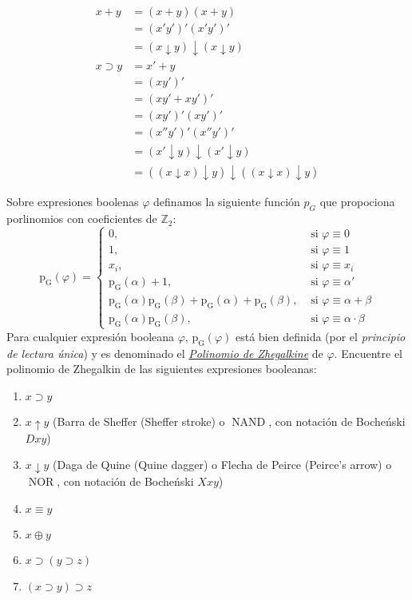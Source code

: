 \begin{solution}
\begin{align*}
    x+y&=(x+y)(x+y)\\
       &=(x'y')'(x'y')'\\
       &=(x\downarrow y)\downarrow (x\downarrow y)\\
    x\supset y&=x'+y\\
              &=(xy')'\\
              &=(xy'+xy')'\\
              &=(xy')'(xy')'\\
              &=(x''y')'(x''y')'\\
              &=(x'\downarrow y)\downarrow (x'\downarrow y)\\
              &=((x\downarrow x)\downarrow y)\downarrow
                ((x\downarrow x)\downarrow y)
  \end{align*}
\end{solution}

\begin{exercise}
  Sobre expresiones boolenas $\varphi$ definamos la siguiente
  función $p_{G}$ que propociona porlinomios con coeficientes de
  $\mathbb{Z}_{2}$:
  \begin{equation*}
    \operatorname{p_{G}}(\varphi)=
    \begin{cases}
      0,&\text{ si }\varphi\equiv 0\\
      1,&\text{ si }\varphi\equiv 1\\
      x_{i},&\text{ si }\varphi\equiv x_{i}\\
      \operatorname{p_{G}}(\alpha)+1,
      &\text{ si }\varphi\equiv\alpha'\\
      \operatorname{p_{G}}(\alpha)\operatorname{p_{G}}(\beta)
      +\operatorname{p_{G}}(\alpha)
      +\operatorname{p_{G}}(\beta),&\text{ si }\varphi\equiv\alpha+\beta\\
      \operatorname{p_{G}}(\alpha)\operatorname{p_{G}}(\beta),
      &\text{ si }\varphi\equiv\alpha\cdot\beta
    \end{cases}
  \end{equation*}
  Para cualquier expresión booleana $\varphi$,
  $\operatorname{p_{G}}(\varphi)$ está bien definida (por el
  \textit{principio de lectura única}) y es denominado el
  \href{https://en.wikipedia.org/wiki/Ivan_Ivanovich_Zhegalkin}{\textit{Polinomio
      de Zhegalkine}} de $\varphi$. Encuentre el polinomio de
  Zhegalkin de las siguientes expresiones booleanas:
  \begin{enumerate}
  \item $x\supset y$
  \item $x\uparrow y$ (Barra de Sheffer (Sheffer stroke) o
    $\operatorname{NAND}$, con notación de Bocheński $Dxy$)
  \item $x\downarrow y$ (Daga de Quine (Quine dagger) o Flecha de
    Peirce (Peirce's arrow) o $\operatorname{NOR}$, con notación de Bocheński $Xxy$)
  \item $x\equiv y$
  \item $x\oplus y$
  \item $x\supset(y\supset z)$
  \item $(x\supset y)\supset z$
  \end{enumerate}
\end{exercise}


